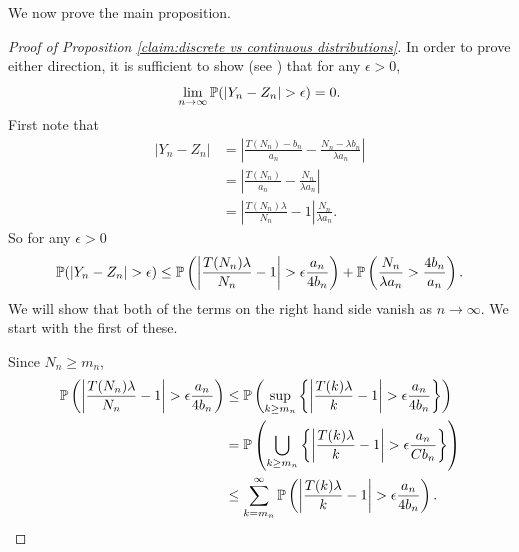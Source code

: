 	We now prove the main proposition.
	\begin{proof}[Proof of Proposition \ref{claim:discrete vs continuous distributions}]
		In order to prove either direction, it is sufficient to show (see \cite[Theorem 25.4]{Billingsley1995-en}) that for any $\epsilon > 0$,
		\begin{equation}
			\lim_{n\rightarrow \infty} \mathbb{P}(|Y_n - Z_n| > \epsilon) = 0.
			\label{eq:Prob Yn - Zn > epsilon goes to zero}
		\end{equation}
		First note that
		\begin{align}
			|Y_n - Z_n| &= \left|\frac{T(N_n) - b_n}{a_n} - \frac{N_n - \lambda b_n}{\lambda a_n}\right|\\
			&= \left|\frac{T(N_n)}{a_n} - \frac{N_n}{\lambda a_n}\right|\\
			&= \left|\frac{T(N_n) \lambda }{N_n} - 1\right|\frac{N_n}{\lambda a_n}.
		\end{align}
		So for any $\epsilon > 0$
		\begin{equation}
			\mathbb{P}(|Y_n - Z_n| > \epsilon) \leq \mathbb{P}\left(\left|\frac{T(N_n)\lambda}{N_n} - 1\right| > \epsilon\frac{a_n}{4 b_n} \right) + \mathbb{P}\left(\frac{N_n}{\lambda a_n} > \frac{4 b_n}{a_n} \right).
			\label{eq:both terms difference Y_n Z_n}
		\end{equation}
		We will show that both of the terms on the right hand side vanish as $n \rightarrow \infty$. We start with the first of these.

		Since $N_n \geq m_n$, 
		\begin{align}
			\prob\left(\left|\frac{T(N_n)\lambda}{N_n} - 1\right| > \epsilon\frac{a_n}{4 b_n} \right) &\leq \prob\left(\sup_{k \geq m_n}\left\{\left|\frac{T(k)\lambda}{k} - 1\right| > \epsilon\frac{a_n}{4 b_n} \right\} \right)\\
			&= \prob\left(\bigcup_{k \geq m_n} \left\{ \left|\frac{T(k)\lambda}{k} - 1\right| > \epsilon\frac{a_n}{C b_n} \right\}\right)\\
			&\leq \sum_{k = m_n}^\infty \prob\left(\left|\frac{T(k)\lambda}{k} - 1\right| > \epsilon\frac{a_n}{4 b_n} \right).%
		\end{align}


\end{proof}
